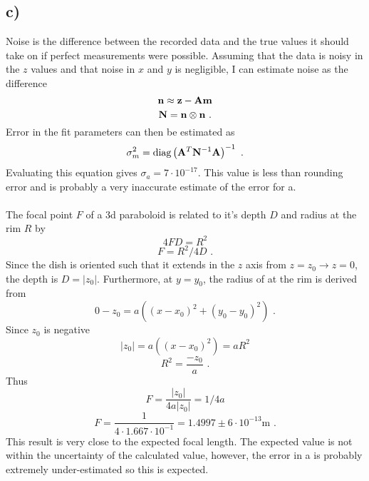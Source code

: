 \documentclass{article}
\newcommand{\<}[1]{\left\langle #1 \right\rangle }
\begin{document}
\subsection{c)}
Noise is the difference between the recorded data and the true values it should take on if perfect measurements were possible. Assuming that the data is noisy in the $z$ values and that noise in $x$ and $y$ is negligible, I can estimate noise as the difference 
\[\vb{n} \approx \vb{z} - \vb{A}\vb{m} \]
\[\vb{N} = \vb{n}\otimes \vb{n} \text{ .}\]
Error in the fit parameters can then be estimated as 
\[\sigma_m^2 = \text{diag} \left( \vb{A}^T\vb{N}^{-1}\vb{A} \right)^{-1} \text{ .} \]
Evaluating this equation gives $\sigma_a = 7\cdot 10^{-17}$. This value is less than rounding error and is probably a very inaccurate estimate of the error for a.\\
\\
The focal point $F$ of a 3d paraboloid is related to it's depth $D$ and radius at the rim $R$ by
\[4FD = R^2\]
\[F = R^2/4D \text{ .}\]
Since the dish is oriented such that it extends in the $z$ axis from $z = z_0 \to z=0$, the depth is $D=|z_0|$. Furthermore, at $y=y_0$, the radius of at the rim is derived from
\[ 0-z_0 = a\left( (x-x_0)^2 + (y_0 - y_0)^2 \right) \text{ .}\]
Since $z_0$ is negative
\[ |z_0| = a\left( (x-x_0)^2 \right) = aR^2 \]
\[R^2 = \frac{-z_0}{a} \text{ .}\]
Thus
\[ F =  \frac{|z_0|}{4a|z_0|} = 1/4a \]
\[\boxed{ F = \frac{1}{4\cdot 1.667\cdot10^{-1}} = 1.4997 \pm 6\cdot10^{-13} \text{m} }\text{ .}\]
This result is very close to the expected focal length. The expected value is not within the uncertainty of the calculated value, however, the error in a is probably extremely under-estimated so this is expected.
\end{document}
